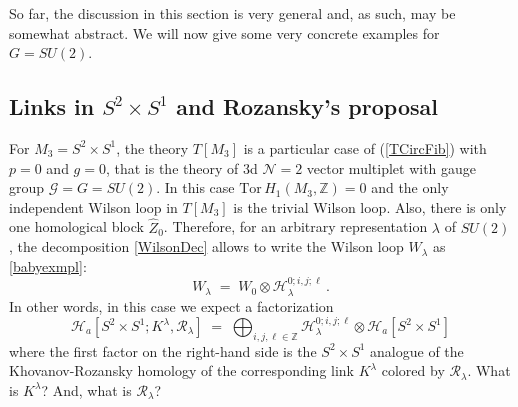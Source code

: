 \documentclass[hyper,letterpaper]{JHEP3}
\newcommand{\be}{\begin{equation}}
\newcommand{\ee}{\end{equation}}
\newcommand{\Z}{{\mathbb Z}}
\renewcommand{\hat}{\widehat}
\def\CG{{\mathcal G}}
\def\CH{{\mathcal H}}
\def\CN{{\mathcal N}}
\def\CR{{\mathcal R}}
\begin{document}
So far, the discussion in this section is very general and, as such, may be somewhat abstract.
We will now give some very concrete examples for $G=SU(2)$.

\subsection{Links in $S^2\times S^1$ and Rozansky's proposal}
\label{sec:Roz}

For $M_3=S^2\times S^1$, the theory $T[M_3]$ is a particular case of (\ref{TCircFib}) with $p=0$ and $g=0$, that is the theory of 3d $\CN=2$ vector multiplet with gauge group $\CG=G=SU(2)$. In this case  $\mathrm{Tor}\,H_1(M_3,\Z)=0$ and the only independent Wilson loop in $T[M_3]$ is the trivial Wilson loop. Also, there is only one homological block $\hat{Z}_0$. Therefore, for an arbitrary representation $\lambda$ of $SU(2)$,
the decomposition \eqref{WilsonDec} allows to write the Wilson loop $W_\lambda$ as \eqref{babyexmpl}:
\be
W_\lambda \; = \; W_0\otimes \CH_{\lambda}^{0;i,j;\ell} \,.
\ee
In other words, in this case we expect a factorization
\begin{equation}
\CH_a[S^2\times S^1;K^{\lambda},\CR_\lambda] \; = \; \bigoplus_{i,j,\ell\in\Z}\CH_{\lambda}^{0;i,j;\ell}\otimes {\CH}_a[S^2\times S^1]
\end{equation}
where the first factor on the right-hand side is the $S^2\times S^1$ analogue of the Khovanov-Rozansky homology
of the corresponding link $K^{\lambda}$ colored by $\CR_{\lambda}$. What is $K^{\lambda}$? And, what is $\CR_{\lambda}$?
\end{document}
